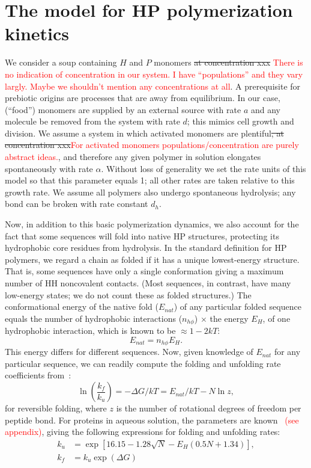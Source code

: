 \documentclass[journal=jacsat,manuscript=article,layout=twocolumn]{achemso}
\newcommand*{\ga}{\alpha}
\newcommand*{\gD}{\Delta}
\newcommand*{\pt}[1]{\left( #1\right)}
\newcommand*{\red}[1]{\textcolor{red}{#1}}
\begin{document}
\section{The model for HP polymerization kinetics}

 We consider a soup containing $H$ and $P$ monomers \sout{at concentration xxx} \red{There is no 
indication of concentration in our system. I have ``populations'' and they vary largly. Maybe we 
shouldn't mention any concentrations at all}.  
 A prerequisite for prebiotic origins are processes that are away from equilibrium.  In our case, 
(``food'') monomers are supplied by 
an external source with rate $a$ and any molecule be removed from the system with rate $d$; this 
mimics cell growth and division. We assume a system in which activated monomers are plentiful\sout{, 
at concentration xxx}\red{For activated monomers populations/concentration are purely abstract 
ideas.}, and therefore any given polymer in solution elongates spontaneously with rate $\ga$.  
Without loss of generality we set the rate units of this model so that this parameter 
equals 1; all other rates are taken relative to this growth rate.  We assume all polymers also 
undergo spontaneous hydrolysis; any bond can be broken with rate constant $d_h$.

 Now, in addition to this basic polymerization dynamics, we also account 
 for the fact that some sequences will fold into native HP structures, protecting its hydrophobic 
core residues from hydrolysis.  In the standard definition for HP polymers, we regard a chain as 
folded if it has a unique lowest-energy structure.  That is, some sequences have only a single 
conformation giving a maximum number of HH noncovalent contacts.  (Most sequences, in contrast, have 
many low-energy states; we do not count these as folded structures.)  The conformational energy of 
the native fold ($E_{nat}$) of any particular folded sequence equals the number of hydrophobic 
interactions ($n_{h\phi}$) $\times$ the energy $E_H$, of one hydrophobic interaction, which is known 
to be $\approx 1-2kT$\cite{Ghosh2009}:
\begin{equation}
 E_{nat}=n_{h\phi}E_H.
\end{equation} 
This energy differs for different sequences.  Now, given knowledge of $E_{nat}$ for any particular 
sequence, we can readily compute the folding and unfolding rate coefficients from~\cite{Ghosh2009}:
\begin{equation}
 \ln\pt{\frac{k_f}{k_u}}=-\gD G/kT = E_{nat}/kT-N\ln z,
\end{equation} 
for reversible folding, where $z$ is the number of rotational degrees of freedom per peptide bond.  
For proteins in aqueous solution, the parameters are known~\cite{Ghosh2010,Dill2011} \red{(see 
appendix)}, 
giving the following expressions for folding and unfolding rates:
\begin{equation}
\begin{split}
  k_u &= \exp[16.15-1.28 \sqrt{N} -E_H(0.5 N + 1.34)],\\
  k_f &= k_u\exp(\gD G)
\end{split}
\end{equation}
\end{document}

